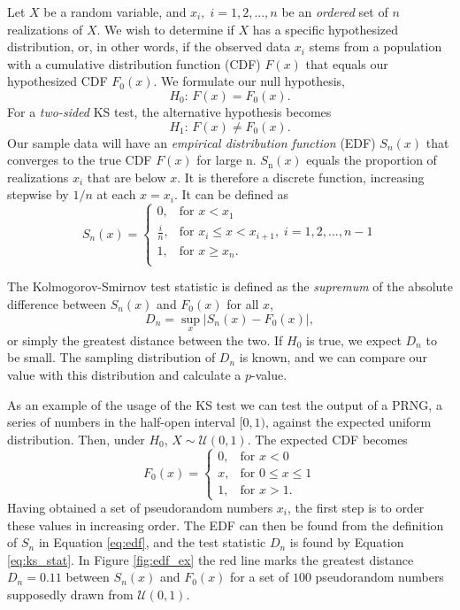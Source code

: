 Let $X$ be a random variable, and $x_i, \; i = 1, 2, ..., n$ be an \emph{ordered} set of $n$ realizations of $X$. We wish to determine if $X$ has a specific hypothesized distribution, or, in other words, if the observed data $x_i$ stems from a population with a cumulative distribution function (CDF) $F(x)\label{eq:cumF}$ that equals our hypothesized CDF $F_0(x)\label{eq:F0}$. We formulate our null hypothesis,
\begin{equation}
H_0: \, F(x) = F_\text{0}(x).
\end{equation}
For a \emph{two-sided} KS test, the alternative hypothesis becomes
\begin{equation}
H_1: \, F(x) \ne F_\text{0}(x).
\end{equation}
Our sample data will have an \emph{empirical distribution function} (EDF) $S_n(x)$ that converges to the true CDF $F(x)$ for large n. $S_\text{n}(x)$ equals the proportion of realizations $x_i$ that are below $x$. It is therefore a discrete function, increasing stepwise by $1/n$ at each $x = x_i$. It can be defined as
\begin{equation}\label{eq:edf}
S_n(x) = 
\begin{cases}
0, & \text{for } x < x_1 \\
\frac{i}{n}, & \text{for } x_i \le x < x_{i+1}, \; i = 1, 2, ..., n-1  \\
1, & \text{for } x \ge x_n. \\
\end{cases}
\end{equation}

The Kolmogorov-Smirnov test statistic is defined as the \emph{supremum} of the absolute difference between $S_n(x)$ and $F_0(x)$ for all $x$, 
\begin{equation}\label{eq:ks_stat}
D_n = \sup_x{| S_n(x) - F_0(x) |},
\end{equation}
or simply the greatest distance between the two. If $H_0$ is true, we expect $D_n$ to be small. The sampling distribution of $D_n$ is known, and we can compare our value with this distribution and calculate a $p$-value. 

As an example of the usage of the KS test we can test the output of a PRNG, a series of numbers in the half-open interval $[0,1)$, against the expected uniform distribution. Then, under $H_0$, $X \sim \mathcal{U}(0, 1)$. The expected CDF becomes
\begin{equation}\label{eq:ks_uniform}
F_0(x) = 
\begin{cases}
0, & \text{for } x < 0 \\
x, & \text{for } 0 \le x \le 1 \\
1, & \text{for } x > 1.
\end{cases}
\end{equation} 
Having obtained a set of pseudorandom numbers $x_i$, the first step is to order these values in increasing order. The EDF can then be found from the definition of $S_n$ in Equation \ref{eq:edf}, and the test statistic $D_n$ is found by Equation \ref{eq:ks_stat}. In Figure \ref{fig:edf_ex} the red line marks the greatest distance $D_n = 0.11$ between $S_n(x)$ and $F_0(x)$ for a set of $100$ pseudorandom numbers supposedly drawn from $\mathcal{U}(0, 1)$. 

